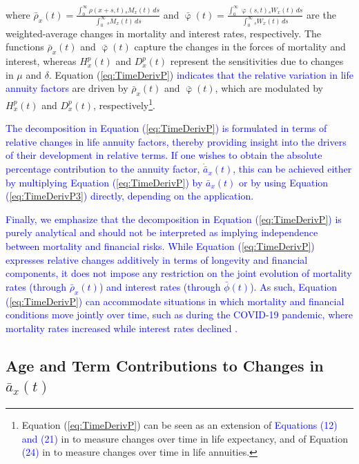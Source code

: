 \documentclass[12pt]{article}
\newcommand{\revision}[1]{\textcolor{blue}{#1}}
\begin{document}
where $\bar{\rho}_x(t) = \frac{\int_0^\infty \rho(x+s,t) {}_s M_x(t) \, ds}{\int_0^\infty {}_s M_x(t) \, ds}$ and 
$\bar{\upvarphi}(t) = \frac{\int_0^\infty \upvarphi(s,t) {}_s W_x(t) \, ds}{\int_0^\infty {}_s W_x(t) \, ds}$ are the weighted-average changes in mortality and interest rates, respectively. The functions $\bar{\rho}_x(t)$ and $\bar{\upvarphi}(t)$ capture the changes in the forces of mortality and interest, whereas ${H}^{p}_x(t)$ and ${D}^{p}_x(t)$ represent the sensitivities due to changes in $\mu$ and $\delta$. Equation (\ref{eq:TimeDerivP}) \textcolor{blue}{indicates that the relative variation in life annuity factors} are driven by $\bar{\rho}_x(t)$ and $\bar{\upvarphi}(t)$, which are modulated by ${H}^{p}_x(t)$ and ${D}^{p}_x(t)$, respectively\color{blue}\footnote{Equation (\ref{eq:TimeDerivP}) can be seen as an extension of \revision{Equations (12) and (21)} in \citet{Vaupel2003} to measure changes over time in life expectancy, and of Equation \revision{(24)} in \citet{di2025decomposing} to measure changes over time in life annuities.}. \color{black}

 \textcolor{blue}{The decomposition in Equation (\ref{eq:TimeDerivP}) is formulated in terms of relative changes in life annuity factors, thereby providing insight into the drivers of their development in relative terms. If one wishes to obtain the absolute percentage contribution to the annuity factor, $\dot{\bar{a}}_{x}(t)$, this can be achieved either by multiplying Equation (\ref{eq:TimeDerivP}) by $\bar{a}_{x}(t)$ or by using Equation (\ref{eq:TimeDerivP3}) directly, depending on the application.}

\revision{Finally, we emphasize that the decomposition in Equation (\ref{eq:TimeDerivP}) is purely analytical and should not be interpreted as implying independence between mortality and financial risks. While Equation (\ref{eq:TimeDerivP}) expresses relative changes additively in terms of longevity and financial components, it does not impose any restriction on the joint evolution of mortality rates (through $\bar{\rho}_x(t)$) and interest rates (through $\bar{\phi}(t)$). As such, Equation (\ref{eq:TimeDerivP}) can accommodate situations in which mortality and financial conditions move jointly over time, such as during the COVID-19 pandemic, where mortality rates increased while interest rates declined \citep{li2023pricing}.}


\subsection{Age and Term Contributions to Changes in $\bar{a}_x(t)$}
\end{document}
